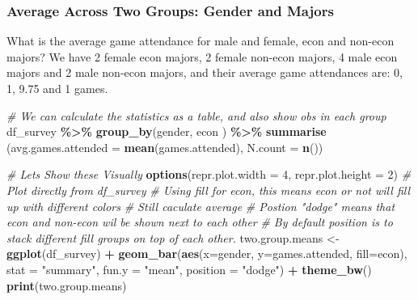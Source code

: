 \documentclass[
]{book}
\newenvironment{Shaded}{\begin{snugshade}}{\end{snugshade}}
\newcommand{\CommentTok}[1]{\textcolor[rgb]{0.56,0.35,0.01}{\textit{#1}}}
\newcommand{\DataTypeTok}[1]{\textcolor[rgb]{0.13,0.29,0.53}{#1}}
\newcommand{\DecValTok}[1]{\textcolor[rgb]{0.00,0.00,0.81}{#1}}
\newcommand{\KeywordTok}[1]{\textcolor[rgb]{0.13,0.29,0.53}{\textbf{#1}}}
\newcommand{\NormalTok}[1]{#1}
\newcommand{\OperatorTok}[1]{\textcolor[rgb]{0.81,0.36,0.00}{\textbf{#1}}}
\newcommand{\StringTok}[1]{\textcolor[rgb]{0.31,0.60,0.02}{#1}}
\begin{document}
\hypertarget{average-across-two-groups-gender-and-majors}{%
\subsubsection{Average Across Two Groups: Gender and Majors}\label{average-across-two-groups-gender-and-majors}}

What is the average game attendance for male and female, econ and non-econ majors? We have 2 female econ majors, 2 female non-econ majors, 4 male econ majors and 2 male non-econ majors, and their average game attendances are: 0, 1, 9.75 and 1 games.

\begin{Shaded}
\begin{Highlighting}[]
\CommentTok{\# We can calculate the statistics as a table, and also show obs in each group}
\NormalTok{df\_survey }\OperatorTok{\%\textgreater{}\%}
\StringTok{    }\KeywordTok{group\_by}\NormalTok{(gender, econ ) }\OperatorTok{\%\textgreater{}\%}
\StringTok{    }\KeywordTok{summarise}\NormalTok{ (}\DataTypeTok{avg.games.attended =} \KeywordTok{mean}\NormalTok{(games.attended), }\DataTypeTok{N.count =} \KeywordTok{n}\NormalTok{())}
\end{Highlighting}
\end{Shaded}

\begin{Shaded}
\begin{Highlighting}[]
\CommentTok{\# Let\textquotesingle{}s Show these Visually}
\KeywordTok{options}\NormalTok{(}\DataTypeTok{repr.plot.width =} \DecValTok{4}\NormalTok{, }\DataTypeTok{repr.plot.height =} \DecValTok{2}\NormalTok{)}
\CommentTok{\# Plot directly from df\_survey}
\CommentTok{\# Using fill for econ, this means econ or not will fill up with different colors}
\CommentTok{\# Still caculate average}
\CommentTok{\# Postion "dodge" means that econ and non{-}econ wil be shown next to each other}
\CommentTok{\# By default position is to stack different fill groups on top of each other.}
\NormalTok{two.group.means \textless{}{-}}\StringTok{ }\KeywordTok{ggplot}\NormalTok{(df\_survey) }\OperatorTok{+}
\StringTok{    }\KeywordTok{geom\_bar}\NormalTok{(}\KeywordTok{aes}\NormalTok{(}\DataTypeTok{x=}\NormalTok{gender, }\DataTypeTok{y=}\NormalTok{games.attended, }\DataTypeTok{fill=}\NormalTok{econ),}
             \DataTypeTok{stat =} \StringTok{"summary"}\NormalTok{, }\DataTypeTok{fun.y =} \StringTok{"mean"}\NormalTok{, }\DataTypeTok{position =} \StringTok{"dodge"}\NormalTok{) }\OperatorTok{+}
\StringTok{    }\KeywordTok{theme\_bw}\NormalTok{()}
\KeywordTok{print}\NormalTok{(two.group.means)}
\end{Highlighting}
\end{Shaded}
\end{document}
